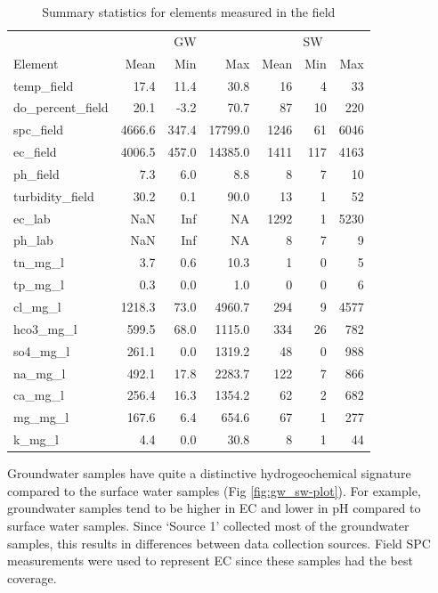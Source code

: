 \documentclass[, manuscript]{copernicus}
\begin{document}
\begin{table}
\centering
\caption{\label{tab:TableElementstats}Summary statistics for elements measured in the field}
\centering
\begin{tabular}[t]{l|r|r|r|r|r|r}
\hline
\multicolumn{1}{c|}{} & \multicolumn{3}{c|}{GW} & \multicolumn{3}{c}{SW} \\
\cline{2-4} \cline{5-7}
Element & Mean & Min & Max & Mean & Min & Max\\
\hline
temp\_field & 17.4 & 11.4 & 30.8 & 16 & 4 & 33\\
\hline
do\_percent\_field & 20.1 & -3.2 & 70.7 & 87 & 10 & 220\\
\hline
spc\_field & 4666.6 & 347.4 & 17799.0 & 1246 & 61 & 6046\\
\hline
ec\_field & 4006.5 & 457.0 & 14385.0 & 1411 & 117 & 4163\\
\hline
ph\_field & 7.3 & 6.0 & 8.8 & 8 & 7 & 10\\
\hline
turbidity\_field & 30.2 & 0.1 & 90.0 & 13 & 1 & 52\\
\hline
ec\_lab & NaN & Inf & NA & 1292 & 1 & 5230\\
\hline
ph\_lab & NaN & Inf & NA & 8 & 7 & 9\\
\hline
tn\_mg\_l & 3.7 & 0.6 & 10.3 & 1 & 0 & 5\\
\hline
tp\_mg\_l & 0.3 & 0.0 & 1.0 & 0 & 0 & 6\\
\hline
cl\_mg\_l & 1218.3 & 73.0 & 4960.7 & 294 & 9 & 4577\\
\hline
hco3\_mg\_l & 599.5 & 68.0 & 1115.0 & 334 & 26 & 782\\
\hline
so4\_mg\_l & 261.1 & 0.0 & 1319.2 & 48 & 0 & 988\\
\hline
na\_mg\_l & 492.1 & 17.8 & 2283.7 & 122 & 7 & 866\\
\hline
ca\_mg\_l & 256.4 & 16.3 & 1354.2 & 62 & 2 & 682\\
\hline
mg\_mg\_l & 167.6 & 6.4 & 654.6 & 67 & 1 & 277\\
\hline
k\_mg\_l & 4.4 & 0.0 & 30.8 & 8 & 1 & 44\\
\hline
\end{tabular}
\end{table}

Groundwater samples have quite a distinctive hydrogeochemical signature
compared to the surface water samples (Fig \ref{fig:gw_sw-plot}). For
example, groundwater samples tend to be higher in EC and lower in pH
compared to surface water samples. Since `Source 1' collected most of
the groundwater samples, this results in differences between data
collection sources. Field SPC measurements were used to represent EC
since these samples had the best coverage.
\end{document}
